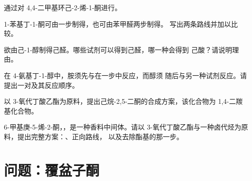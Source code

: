 \begin{exercise}[$\star\star$]\label{exo:b2:retrosynthesis:7}
通过对 4,4-二甲基环己-2-烯-1-酮进行。
\end{exercise}

\begin{exercise}[$\star\star$]\label{exo:b2:retrosynthesis:8}
1-苯基丁-1-酮可由一步制得，也可由苯甲醛两步制得。
写出两条路线并加以比较。
\end{exercise}

\begin{exercise}[$\star\star$]\label{exo:b2:retrosynthesis:9}
欲由己-1-醇制得己醛。哪些试剂可以得到己醛，哪一种会得到
己酸？请说明理由。
\end{exercise}

\begin{exercise}[$\star\star\star$]\label{exo:b2:retrosynthesis:10}
在 4-氨基丁-1-醇中，胺须先与在一步中反应，而醇须
随后与另一种试剂反应。请提出一对及其反应顺序。
\end{exercise}

\begin{exercise}[$\star\star\star$]\label{exo:b2:retrosynthesis:11}
以 3-氧代丁酸乙酯为原料，提出己烷-2,5-二酮的合成方案，该化合物为 1,4-二羰基化合物。
\end{exercise}

\begin{exercise}[$\star\star\star$]\label{exo:b2:retrosynthesis:12}
6-甲基庚-5-烯-2-酮，，是一种香料中间体。请以
3-氧代丁酸乙酯与一种卤代烃为原料，提出完整方案：、正向路线，
以及去除酯基的那一步。
\end{exercise}

\section{问题：覆盆子酮}

